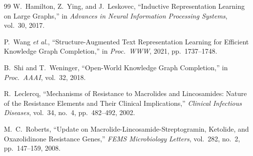 \documentclass[conference]{IEEEtran}
\begin{document}
\begin{thebibliography}{99}
W.~Hamilton, Z.~Ying, and J.~Leskovec, ``Inductive Representation Learning
on Large Graphs,'' in \textit{Advances in Neural Information Processing
Systems}, vol.~30, 2017.

P.~Wang \textit{et al.}, ``Structure-Augmented Text Representation Learning
for Efficient Knowledge Graph Completion,'' in \textit{Proc.\ WWW}, 2021,
pp.~1737--1748.

B.~Shi and T.~Weninger, ``Open-World Knowledge Graph Completion,''
in \textit{Proc.\ AAAI}, vol.~32, 2018.

R.~Leclercq, ``Mechanisms of Resistance to Macrolides and Lincosamides:
Nature of the Resistance Elements and Their Clinical Implications,''
\textit{Clinical Infectious Diseases}, vol.~34, no.~4, pp.~482--492, 2002.

M.~C.~Roberts, ``Update on Macrolide-Lincosamide-Streptogramin,
Ketolide, and Oxazolidinone Resistance Genes,''
\textit{FEMS Microbiology Letters}, vol.~282, no.~2, pp.~147--159, 2008.

\end{thebibliography}
\end{document}

